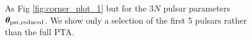 \documentclass[fleqn,usenatbib,useAMS]{mnras}
\begin{document}
\begin{figure}%
	\centering
	\qquad
	\qquad
	
	\caption{As Fig \ref{fig:corner_plot_1} but for the $3N$ pulsar parameters $\boldsymbol{\theta}_{\rm psr, reduced}$. We show only a selection of the first 5 pulsars rather than the full PTA.}
	\label{fig:example_psr_params}%
\end{figure}








%
%
%
%
%
%
%
%
\end{document}
